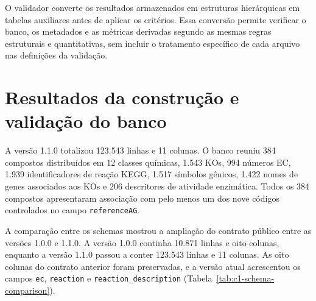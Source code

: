 O validador converte os resultados armazenados em estruturas hierárquicas em
tabelas auxiliares antes de aplicar os critérios. Essa conversão permite
verificar o banco, os metadados e as métricas derivadas segundo as mesmas
regras estruturais e quantitativas, sem incluir o tratamento específico de
cada arquivo nas definições da validação.


\section{Resultados da construção e validação do banco}
\label{sec:c1-resultados}

A versão 1.1.0 totalizou 123.543 linhas e 11 colunas. O banco reuniu
384 compostos distribuídos em 12 classes químicas, 1.543 KOs, 994 números EC,
1.939 identificadores de reação KEGG, 1.517 símbolos gênicos, 1.422 nomes de
genes associados aos KOs e 206 descritores de atividade enzimática. Todos os
384 compostos apresentaram associação com pelo menos um dos nove códigos
controlados no campo \texttt{referenceAG}.

A comparação entre os schemas mostrou a ampliação do contrato público entre as
versões 1.0.0 e 1.1.0. A versão 1.0.0 continha 10.871 linhas e oito colunas,
enquanto a versão 1.1.0 passou a conter 123.543 linhas e 11 colunas. As oito
colunas do contrato anterior foram preservadas, e a versão atual acrescentou
os campos \texttt{ec}, \texttt{reaction} e
\texttt{reaction\_description} (Tabela~\ref{tab:c1-schema-comparison}).

